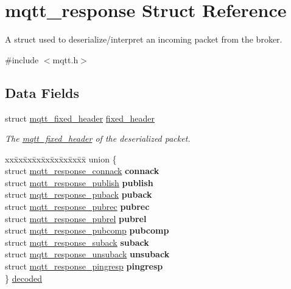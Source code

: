 \hypertarget{structmqtt__response}{}\section{mqtt\+\_\+response Struct Reference}
\label{structmqtt__response}


A struct used to deserialize/interpret an incoming packet from the broker.  




{\ttfamily \#include $<$mqtt.\+h$>$}

\subsection*{Data Fields}
\begin{DoxyCompactItemize}
\item 
struct \hyperlink{structmqtt__fixed__header}{mqtt\+\_\+fixed\+\_\+header} \hyperlink{structmqtt__response_aa8f110125c17b765fab496bf1c2c7394}{fixed\+\_\+header}\hypertarget{structmqtt__response_aa8f110125c17b765fab496bf1c2c7394}{}\label{structmqtt__response_aa8f110125c17b765fab496bf1c2c7394}

\begin{DoxyCompactList}\small\item\em The \hyperlink{structmqtt__fixed__header}{mqtt\+\_\+fixed\+\_\+header} of the deserialized packet. \end{DoxyCompactList}\item 
\begin{tabbing}
xx\=xx\=xx\=xx\=xx\=xx\=xx\=xx\=xx\=\kill
union \{\\
\>struct \hyperlink{structmqtt__response__connack}{mqtt\_response\_connack} {\bfseries connack}\\
\>struct \hyperlink{structmqtt__response__publish}{mqtt\_response\_publish} {\bfseries publish}\\
\>struct \hyperlink{structmqtt__response__puback}{mqtt\_response\_puback} {\bfseries puback}\\
\>struct \hyperlink{structmqtt__response__pubrec}{mqtt\_response\_pubrec} {\bfseries pubrec}\\
\>struct \hyperlink{structmqtt__response__pubrel}{mqtt\_response\_pubrel} {\bfseries pubrel}\\
\>struct \hyperlink{structmqtt__response__pubcomp}{mqtt\_response\_pubcomp} {\bfseries pubcomp}\\
\>struct \hyperlink{structmqtt__response__suback}{mqtt\_response\_suback} {\bfseries suback}\\
\>struct \hyperlink{structmqtt__response__unsuback}{mqtt\_response\_unsuback} {\bfseries unsuback}\\
\>struct \hyperlink{structmqtt__response__pingresp}{mqtt\_response\_pingresp} {\bfseries pingresp}\\
\} \hyperlink{structmqtt__response_a06d09e11b0023e31e281313df13184ff}{decoded}\\


\end{tabbing}
\end{DoxyCompactItemize}
